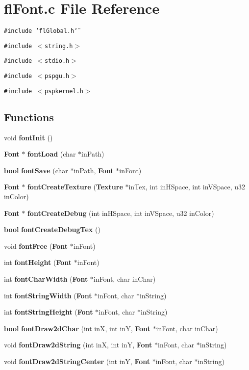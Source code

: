 \section{fl\-Font.c File Reference}
\label{flFont_8c}
{\tt \#include \char`\"{}fl\-Global.h\char`\"{}}\par
{\tt \#include $<$string.h$>$}\par
{\tt \#include $<$stdio.h$>$}\par
{\tt \#include $<$pspgu.h$>$}\par
{\tt \#include $<$pspkernel.h$>$}\par
\subsection*{Functions}
\begin{CompactItemize}
\item 
void {\bf font\-Init} ()
\item 
{\bf Font} $\ast$ {\bf font\-Load} (char $\ast$in\-Path)
\item 
{\bf bool} {\bf font\-Save} (char $\ast$in\-Path, {\bf Font} $\ast$in\-Font)
\item 
{\bf Font} $\ast$ {\bf font\-Create\-Texture} ({\bf Texture} $\ast$in\-Tex, int in\-HSpace, int in\-VSpace, u32 in\-Color)
\item 
{\bf Font} $\ast$ {\bf font\-Create\-Debug} (int in\-HSpace, int in\-VSpace, u32 in\-Color)
\item 
{\bf bool} {\bf font\-Create\-Debug\-Tex} ()
\item 
void {\bf font\-Free} ({\bf Font} $\ast$in\-Font)
\item 
int {\bf font\-Height} ({\bf Font} $\ast$in\-Font)
\item 
int {\bf font\-Char\-Width} ({\bf Font} $\ast$in\-Font, char in\-Char)
\item 
int {\bf font\-String\-Width} ({\bf Font} $\ast$in\-Font, char $\ast$in\-String)
\item 
int {\bf font\-String\-Height} ({\bf Font} $\ast$in\-Font, char $\ast$in\-String)
\item 
{\bf bool} {\bf font\-Draw2d\-Char} (int in\-X, int in\-Y, {\bf Font} $\ast$in\-Font, char in\-Char)
\item 
void {\bf font\-Draw2d\-String} (int in\-X, int in\-Y, {\bf Font} $\ast$in\-Font, char $\ast$in\-String)
\item 
void {\bf font\-Draw2d\-String\-Center} (int in\-Y, {\bf Font} $\ast$in\-Font, char $\ast$in\-String)
\end{CompactItemize}
